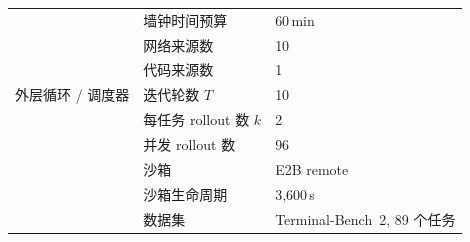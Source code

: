 \begin{table}[h]
\begin{tabular}{lll}
            & 墙钟时间预算          & 60\,min \\
            & 网络来源数                & 10 \\
            & 代码来源数               & 1 \\
        \midrule
        外层循环 / 调度器
            & 迭代轮数 $T$             & 10 \\
            & 每任务 rollout 数 $k$      & 2 \\
            & 并发 rollout 数        & 96 \\
            & 沙箱                    & E2B remote \\
            & 沙箱生命周期            & 3{,}600\,s \\
            & 数据集                     & Terminal-Bench~2, 89 个任务 \\
        \bottomrule
    \end{tabular}
\end{table}
